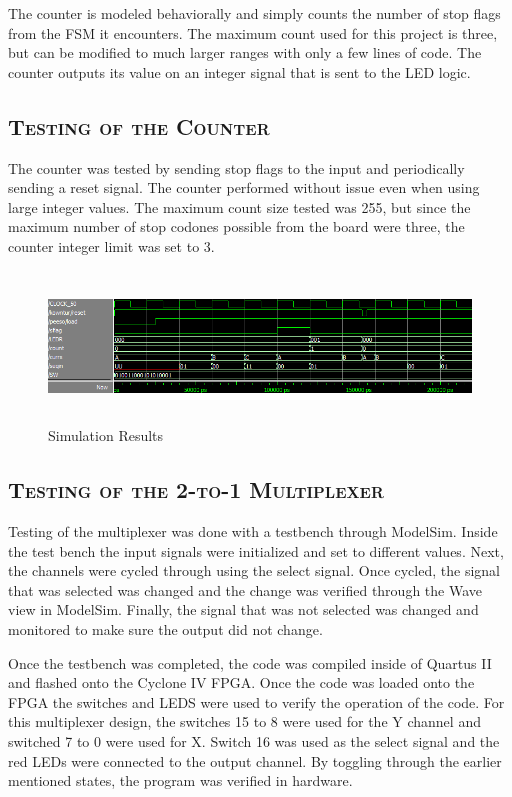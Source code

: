 \documentclass[11pt]{report}
\begin{document}
\begin{spacing}{1.5}
The counter is modeled behaviorally and simply counts the number of stop flags from the FSM it encounters.  The maximum count used for this project is three, but can be modified to much larger ranges with only a few lines of code.  The counter outputs its value on an integer signal that is sent to the LED logic.

\subsection{\scshape Testing of the Counter}
\label{sub:test_counter}

The counter was tested by sending stop flags to the input and periodically sending a reset signal.  The counter performed without issue even when using large integer values.  The maximum count size tested was 255, but since the maximum number of stop codones possible from the board were three, the counter integer limit was set to 3.

\vspace{30px}
\begin{figure}[H]
    \centering
    \includegraphics[width=1.0\textwidth,height=4cm]{simulation}
    \caption{Simulation Results\cite{Synth}}
    \label{fig:testbench}
\end{figure}


\subsection{\scshape Testing of the 2-to-1 Multiplexer}
\label{sec:test_2to1}

Testing of the multiplexer was done with a testbench through ModelSim.  Inside the test bench the input signals were initialized and set to different values.  Next, the channels were cycled through using the select signal.  Once cycled, the signal that was selected was changed and the change was verified through the Wave view in ModelSim.  Finally, the signal that was not selected was changed and monitored to make sure the output did not change.

Once the testbench was completed, the code was compiled inside of Quartus II and flashed onto the Cyclone IV FPGA.  Once the code was loaded onto the FPGA the switches and LEDS were used to verify the operation of the code.  For this multiplexer design, the switches 15 to 8 were used for the Y channel and switched 7 to 0 were used for X.  Switch 16 was used as the select signal and the red LEDs were connected to the output channel.  By toggling through the earlier mentioned states, the program was verified in hardware.


\end{spacing}
\end{document}
